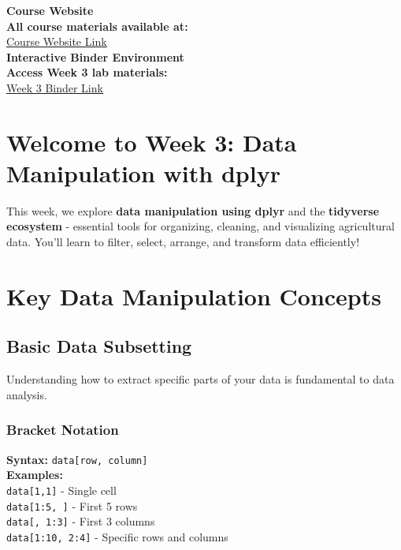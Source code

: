 \documentclass[11pt,a4paper]{article}
\begin{document}
\begin{tcolorbox}[colback=accentgreen!20, colframe=primarygreen, boxrule=2pt, arc=5pt, title={\textbf{\Large Essential Course Resources}}]
\centering
\textbf{\Large Course Website}\\[0.5cm]
\textcolor{primarygreen}{\textbf{All course materials available at:}}\\[0.3cm]
\href{https://mohammadrezanarimaniucdavis.github.io/PLS120-Statistics-Lab-Materials/}{\textcolor{primarygreen}{\underline{Course Website Link}}}\\[0.8cm]

\textbf{\Large Interactive Binder Environment}\\[0.5cm]
\textcolor{primarygreen}{\textbf{Access Week 3 lab materials:}}\\[0.3cm]
\href{https://mybinder.org/v2/gh/MohammadrezaNarimaniUCDavis/PLS120-Statistics-Lab-Materials/binder-week3}{\textcolor{primarygreen}{\underline{Week 3 Binder Link}}}
\end{tcolorbox}

\section{Welcome to Week 3: Data Manipulation with dplyr}

This week, we explore \textbf{data manipulation using dplyr} and the \textbf{tidyverse ecosystem} - essential tools for organizing, cleaning, and visualizing agricultural data. You'll learn to filter, select, arrange, and transform data efficiently!

\section{Key Data Manipulation Concepts}

\subsection{Basic Data Subsetting}

Understanding how to extract specific parts of your data is fundamental to data analysis.

\subsubsection{Bracket Notation}

\begin{formulabox}
\textbf{Syntax:} \texttt{data[row, column]}\\[0.3cm]
\textbf{Examples:}\\
\texttt{data[1,1]} - Single cell\\
\texttt{data[1:5, ]} - First 5 rows\\
\texttt{data[, 1:3]} - First 3 columns\\
\texttt{data[1:10, 2:4]} - Specific rows and columns
\end{formulabox}
\end{document}
